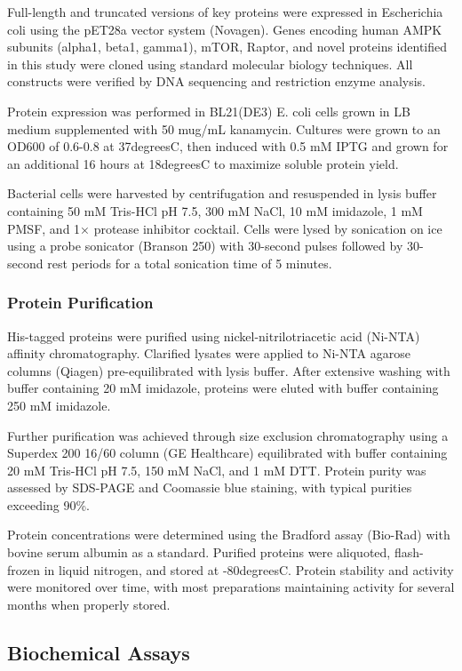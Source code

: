 \documentclass[11pt,a4paper]{article}
\begin{document}
Full-length and truncated versions of key proteins were expressed in Escherichia coli using the pET28a vector system (Novagen). Genes encoding human AMPK subunits (alpha1, beta1, gamma1), mTOR, Raptor, and novel proteins identified in this study were cloned using standard molecular biology techniques. All constructs were verified by DNA sequencing and restriction enzyme analysis.

Protein expression was performed in BL21(DE3) E. coli cells grown in LB medium supplemented with 50 mug/mL kanamycin. Cultures were grown to an OD600 of 0.6-0.8 at 37degreesC, then induced with 0.5 mM IPTG and grown for an additional 16 hours at 18degreesC to maximize soluble protein yield.

Bacterial cells were harvested by centrifugation and resuspended in lysis buffer containing 50 mM Tris-HCl pH 7.5, 300 mM NaCl, 10 mM imidazole, 1 mM PMSF, and 1× protease inhibitor cocktail. Cells were lysed by sonication on ice using a probe sonicator (Branson 250) with 30-second pulses followed by 30-second rest periods for a total sonication time of 5 minutes.

\subsubsection{Protein Purification}

His-tagged proteins were purified using nickel-nitrilotriacetic acid (Ni-NTA) affinity chromatography. Clarified lysates were applied to Ni-NTA agarose columns (Qiagen) pre-equilibrated with lysis buffer. After extensive washing with buffer containing 20 mM imidazole, proteins were eluted with buffer containing 250 mM imidazole.

Further purification was achieved through size exclusion chromatography using a Superdex 200 16/60 column (GE Healthcare) equilibrated with buffer containing 20 mM Tris-HCl pH 7.5, 150 mM NaCl, and 1 mM DTT. Protein purity was assessed by SDS-PAGE and Coomassie blue staining, with typical purities exceeding 90\%.

Protein concentrations were determined using the Bradford assay (Bio-Rad) with bovine serum albumin as a standard. Purified proteins were aliquoted, flash-frozen in liquid nitrogen, and stored at -80degreesC. Protein stability and activity were monitored over time, with most preparations maintaining activity for several months when properly stored.

\subsection{Biochemical Assays}
\end{document}
